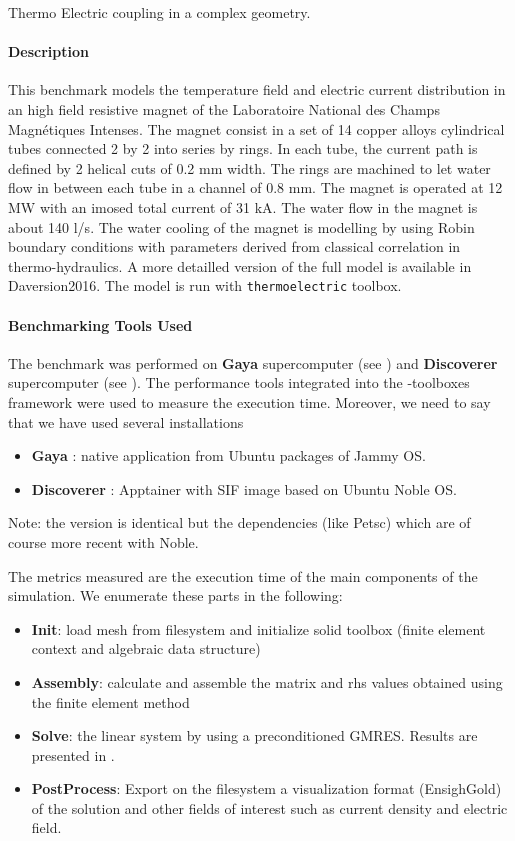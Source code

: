 Thermo Electric coupling in a complex geometry.

\paragraph{Description}

This benchmark models the temperature field and electric current distribution in an high field resistive magnet of the Laboratoire National des Champs Magnétiques Intenses. The magnet consist in a set of 14 copper alloys cylindrical tubes connected 2 by 2 into series by rings. In each tube, the current path is defined by 2 helical cuts of 0.2 mm width. The rings are machined to let water flow in between each tube
in a channel of 0.8 mm. The magnet is operated at 12 MW with an imosed total current of 31 kA. The water flow in the magnet is about 140 l/s. The water cooling of the magnet is modelling by using Robin boundary conditions with parameters derived from classical correlation in thermo-hydraulics.
A more detailled version of the full model is available in Daversion2016. The model is run with \texttt{thermoelectric} \Feelpp toolbox. 

\paragraph{Benchmarking Tools Used}
The benchmark was performed on \textbf{Gaya} supercomputer (see ) and \textbf{Discoverer} supercomputer (see
).
The performance tools integrated into the \Feelpp-toolboxes framework were used to measure
the execution time.
Moreover, we need to say that we have used several \Feelpp installations
\begin{itemize}
\item \textbf{Gaya} : native application from Ubuntu packages of Jammy OS.
\item \textbf{Discoverer} : Apptainer with \Feelpp SIF image based on Ubuntu
  Noble OS.
\end{itemize}
Note: the \Feelpp version is identical but the dependencies (like Petsc)
which are of course more recent with Noble.

The metrics measured are the execution time of the main components of the simulation. We enumerate these parts in the following:
\begin{itemize}
\item \textbf{Init}: load mesh from filesystem and initialize solid toolbox (finite element context and algebraic data structure)
\item \textbf{Assembly}: calculate and assemble the matrix and rhs values obtained using the finite element method
\item \textbf{Solve}: the linear system by using a preconditioned GMRES. Results
  are presented in .
\item \textbf{PostProcess}: Export on the filesystem a visualization format (EnsighGold) of the
  solution and other fields of interest such as current density and electric field.
\end{itemize}


